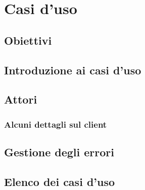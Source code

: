\section{Casi d'uso}
\subsection{Obiettivi}
\subsection{Introduzione ai casi d'uso}
\subsection{Attori}
\subsubsection{Alcuni dettagli sul client}
\subsection{Gestione degli errori}
\subsection{Elenco dei casi d'uso}


